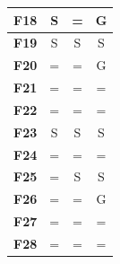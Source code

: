\documentclass[12pt,a4paper]{report}
\begin{document}
{{{{{{{\begin{table}[]
\begin{tabular}{|l|c|c|c|}
{\bf F18}                     & S        & =         & G         \\ \hline
{\bf F19}                     & S        & S         & S         \\ \hline
{\bf F20}                     & =        & =         & G         \\ \hline
{\bf F21}                     & =        & =         & =         \\ \hline
{\bf F22}                     & =        & =         & =         \\ \hline
{\bf F23}                     & S        & S         & S         \\ \hline
{\bf F24}                     & =        & =         & =         \\ \hline
{\bf F25}                     & =        & S         & S         \\ \hline
{\bf F26}                     & =        & =         & G         \\ \hline
{\bf F27}                     & =        & =         & =         \\ \hline
{\bf F28}                     & =        & =         & =         \\ \hline
\end{tabular}
\end{table}

}}}}}}}
\end{document}

